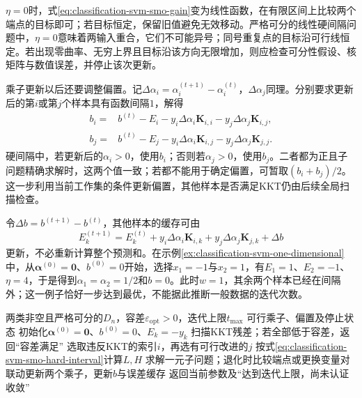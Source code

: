 $\eta=0$时，式\eqref{eq:classification-svm-smo-gain}变为线性函数，在有限区间上比较两个端点的目标即可；若目标恒定，保留旧值避免无效移动。严格可分的线性硬间隔问题中，$\eta=0$意味着两输入重合，它们不可能异号；同号重复点的目标沿可行线恒定。若出现零曲率、无穷上界且目标沿该方向无限增加，则应检查可分性假设、核矩阵与数值误差，并停止该次更新。

乘子更新以后还要调整偏置。记$\Delta\alpha_i=\alpha_i^{(t+1)}-\alpha_i^{(t)}$，$\Delta\alpha_j$同理。分别要求更新后的第$i$或第$j$个样本具有函数间隔$1$，解得
\begin{equation}
  \begin{aligned}
    b_i={}&b^{(t)}-E_i
       -y_i\Delta\alpha_i\bm{K}_{i,i}
       -y_j\Delta\alpha_j\bm{K}_{i,j},\\
    b_j={}&b^{(t)}-E_j
       -y_i\Delta\alpha_i\bm{K}_{i,j}
       -y_j\Delta\alpha_j\bm{K}_{j,j}.
  \end{aligned}
  \label{eq:classification-svm-smo-bias}
\end{equation}
硬间隔中，若更新后的$\alpha_i>0$，使用$b_i$；否则若$\alpha_j>0$，使用$b_j$。二者都为正且子问题精确求解时，这两个值一致；若都不能用于确定偏置，可暂取$(b_i+b_j)/2$。这一步利用当前工作集的条件更新偏置，其他样本是否满足KKT仍由后续全局扫描检查。

令$\Delta b=b^{(t+1)}-b^{(t)}$，其他样本的缓存可由
\[
  E_k^{(t+1)}
  =E_k^{(t)}
   +y_i\Delta\alpha_i\bm{K}_{i,k}
   +y_j\Delta\alpha_j\bm{K}_{j,k}
   +\Delta b
\]
更新，不必重新计算整个预测和。在示例\ref{ex:classification-svm-one-dimensional}中，从$\bm{\alpha}^{(0)}=\bm{0}$、$b^{(0)}=0$开始，选择$x_1=-1$与$x_2=1$，有$E_1=1$、$E_2=-1$、$\eta=4$，于是得到$\alpha_1=\alpha_2=1/2$和$b=0$。此时$w=1$，其余两个样本已经在间隔外；这一例子恰好一步达到最优，不能据此推断一般数据的迭代次数。

\begin{algorithm}[硬间隔SMO的训练框架]
  \label{alg:classification-svm-smo}
  \begin{algorithmic}[1]
    \Require 两类非空且严格可分的$D_n$，容差$\varepsilon_{\mathrm{opt}}>0$，迭代上限$t_{\max}$
    \Ensure 可行乘子、偏置及停止状态
    \State 初始化$\bm{\alpha}^{(0)}=\bm{0}$、$b^{(0)}=0$、$E_k=-y_k$
      \State 扫描KKT残差；若全部低于容差，返回“容差满足”
      \State 选取违反KKT的索引$i$，再选有可行改进的$j$
      \State 按式\eqref{eq:classification-svm-smo-hard-interval}计算$L,H$
      \State 求解一元子问题；退化时比较端点或更换变量对
      \State 联动更新两个乘子，更新$b$与误差缓存
    \EndFor
    \State 返回当前参数及“达到迭代上限，尚未认证收敛”
  \end{algorithmic}
\end{algorithm}

